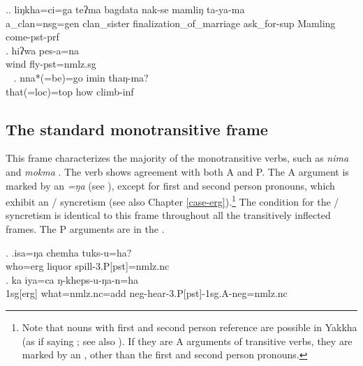 \ex.\ag. liŋkha=ci=ga teʔma  bagdata nak-se mamliŋ ta-ya-ma\\
	a\_clan{\sc =nsg=gen} clan\_sister finalization\_of\_marriage ask\_for{\sc -sup} Mamling  come{\sc [3sg]-pst-prf}\\
	 
\bg. hiʔwa pes-a=na\\
wind fly{\sc [3sg]-pst=nmlz.sg}\\\
 
\bg. nna*(=be)=go imin thaŋ-ma?\\
that{\sc *(=loc)=top} how climb{\sc -inf} \\
 



\subsection{The standard monotransitive frame}\label{stand-tr}


\noindent
This frame characterizes the majority of the monotransitive verbs, such as \emph{nima}  and  \emph{mokma} . The verb shows agreement with both A and P. The A argument is  marked by an   \emph{=ŋa} (see \Next[a]), except for first and second person pronouns, which exhibit an / syncretism (see also Chapter \ref{case-erg}).\footnote{Note that nouns with first and second person reference are possible in Yakkha (as if saying ; see also ). If they are A arguments of transitive verbs, they are marked by an , other than the first and second person pronouns.} The condition for the / syncretism is identical to this frame throughout all the transitively inflected frames. The P arguments are in the  . 

 \ex. \ag.isa=ŋa chemha tuks-u=ha?\\
		who{\sc =erg} liquor spill{\sc -3.P[pst]=nmlz.nc}\\
 \bg. ka iya=ca ŋ-kheps-u-ŋa-n=ha\\
  {\sc 1sg[erg]} what{\sc =nmlz.nc=add}  {\sc neg}-hear-{\sc 3.P[pst]-1sg.A-neg=nmlz.nc}\\
 \rede{I did not hear anything.}
 
